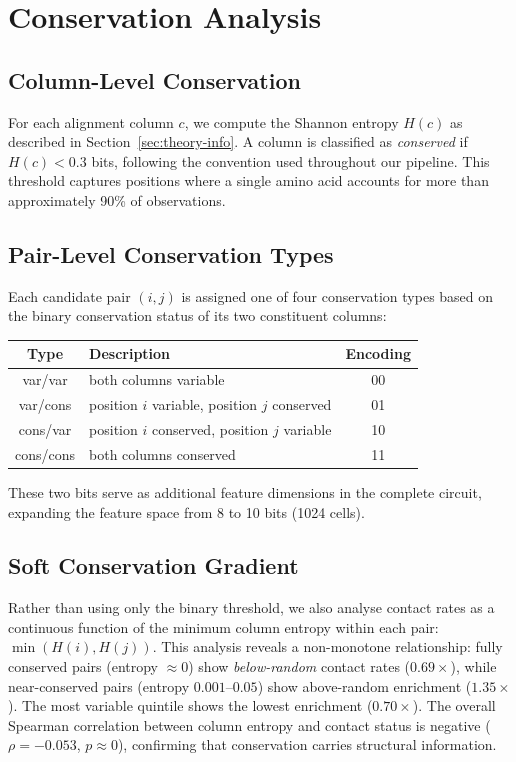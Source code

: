 \section{Conservation Analysis}
\label{sec:methods-conservation}

\subsection{Column-Level Conservation}
For each alignment column $c$, we compute the Shannon entropy $H(c)$ as
described in Section~\ref{sec:theory-info}.  A column is classified as
\emph{conserved} if $H(c) < 0.3$ bits, following the convention used
throughout our pipeline.  This threshold captures positions where a single
amino acid accounts for more than approximately 90\% of observations.

\subsection{Pair-Level Conservation Types}
Each candidate pair $(i, j)$ is assigned one of four conservation types based
on the binary conservation status of its two constituent columns:

\begin{center}
	\begin{tabular}{clc}
		\toprule
		Type      & Description                                   & Encoding \\
		\midrule
		var/var   & both columns variable                         & 00       \\
		var/cons  & position $i$ variable, position $j$ conserved & 01       \\
		cons/var  & position $i$ conserved, position $j$ variable & 10       \\
		cons/cons & both columns conserved                        & 11       \\
		\bottomrule
	\end{tabular}
\end{center}

These two bits serve as additional feature dimensions in the complete circuit,
expanding the feature space from 8 to 10 bits (1024 cells).

\subsection{Soft Conservation Gradient}
Rather than using only the binary threshold, we also analyse contact rates as
a continuous function of the minimum column entropy within each pair:
$\min(H(i), H(j))$.  This analysis reveals a non-monotone relationship:
fully conserved pairs (entropy $\approx 0$) show \emph{below-random} contact
rates ($0.69\times$), while near-conserved pairs (entropy $0.001$--$0.05$)
show above-random enrichment ($1.35\times$).  The most variable quintile shows
the lowest enrichment ($0.70\times$).  The overall Spearman correlation between
column entropy and contact status is negative ($\rho = -0.053$, $p \approx 0$),
confirming that conservation carries structural information.

